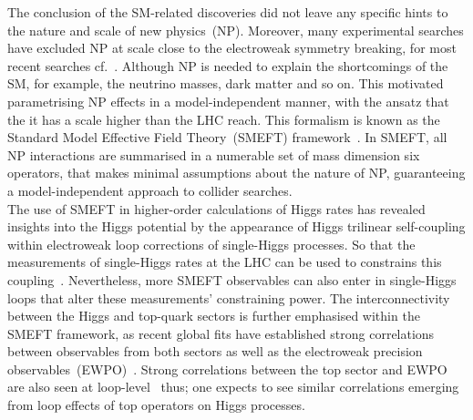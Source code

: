 The conclusion of the SM-related discoveries did not leave any specific hints to the nature and scale of new physics~(NP).  Moreover, many experimental searches have excluded NP at scale close to the electroweak symmetry breaking, for most recent searches cf.~\cite{ATLAS-CONF-2022-006,ATLAS-CONF-2022-011,ATLAS-CONF-2022-012,ATLAS-CONF-2022-010,ATLAS-CONF-2022-009,CMS-PAS-EXO-20-011,CMS-PAS-EXO-21-010,CMS-PAS-EXO-21-003,CMS-PAS-EXO-20-006,CMS-PAS-EXO-21-006,CMS:2022nty,CMS:2022yjm}. Although NP is needed to explain the shortcomings of the SM, for example, the neutrino masses, dark matter and so on.
This motivated parametrising NP effects in a model-independent manner, with the ansatz that the it has a scale higher than the LHC reach. This formalism is known as the Standard Model Effective Field Theory~(SMEFT) framework~\cite{Giudice:2007fh,Grzadkowski:2010es,Contino:2013kra, Elias-Miro:2013eta,Gupta:2014rxa}. In SMEFT, all NP interactions are summarised in a numerable set of mass dimension six operators, that makes minimal assumptions about the nature of NP, guaranteeing a model-independent approach to collider searches.\\ 
%
The use of SMEFT in higher-order calculations of Higgs rates has revealed insights into the Higgs potential by the appearance of Higgs trilinear self-coupling within electroweak loop corrections of single-Higgs processes. So that the measurements of single-Higgs rates at the LHC can be used to constrains this coupling~\cite{McCullough:2013rea, Gorbahn:2016uoy, Degrassi:2016wml, Bizon:2016wgr, Maltoni:2017ims, Degrassi:2019yix, Degrassi:2021uik, Haisch:2021hvy}. Nevertheless, more SMEFT observables can also enter in single-Higgs loops that alter these measurements' constraining power. The interconnectivity between the Higgs and top-quark sectors is further emphasised within the SMEFT framework, as recent global fits have established strong correlations between observables from both sectors as well as the electroweak precision observables~(EWPO)~\cite{Ellis:2020unq}. Strong correlations between the top sector and EWPO are also seen at loop-level~\cite{Dawson:2020oco} thus; one expects to see similar correlations emerging from loop effects of top operators on Higgs processes. \\
